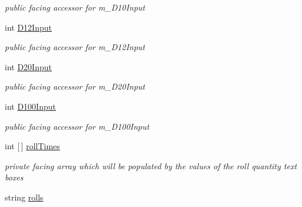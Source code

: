 \begin{DoxyCompactItemize}
\begin{DoxyCompactList}\small\item\em public facing accessor for m\+\_\+\+D10\+Input \end{DoxyCompactList}\item 
int \mbox{\hyperlink{class_dungeons__n___dragons___manager_1_1_viewmodels_1_1_dice_roll_tab_viewmodel_ab7144500ea49e8d9fca4a6a914d36bad}{D12\+Input}}
\begin{DoxyCompactList}\small\item\em public facing accessor for m\+\_\+\+D12\+Input \end{DoxyCompactList}\item 
int \mbox{\hyperlink{class_dungeons__n___dragons___manager_1_1_viewmodels_1_1_dice_roll_tab_viewmodel_a772d8eac074f1327aa0a1e0bf0a609cc}{D20\+Input}}
\begin{DoxyCompactList}\small\item\em public facing accessor for m\+\_\+\+D20\+Input \end{DoxyCompactList}\item 
int \mbox{\hyperlink{class_dungeons__n___dragons___manager_1_1_viewmodels_1_1_dice_roll_tab_viewmodel_adbdf99438f0efe8437cb5d470ea41a91}{D100\+Input}}
\begin{DoxyCompactList}\small\item\em public facing accessor for m\+\_\+\+D100\+Input \end{DoxyCompactList}\item 
int \mbox{[}$\,$\mbox{]} \mbox{\hyperlink{class_dungeons__n___dragons___manager_1_1_viewmodels_1_1_dice_roll_tab_viewmodel_aec8949483f3c2f627c077ff4c698a632}{roll\+Times}}
\begin{DoxyCompactList}\small\item\em private facing array which will be populated by the values of the roll quantity text boxes \end{DoxyCompactList}\item 
string \mbox{\hyperlink{class_dungeons__n___dragons___manager_1_1_viewmodels_1_1_dice_roll_tab_viewmodel_ab086c1846f82827aaa522fbb9f248544}{rolls}}

\end{DoxyCompactItemize}
